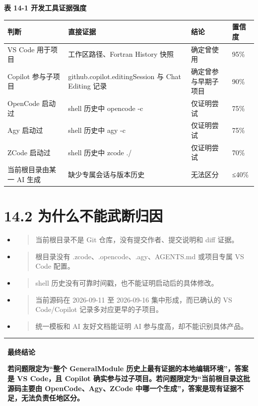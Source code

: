 \documentclass[UTF8,openany,11pt,fontset=fandol]{ctexbook}
\begin{document}
\textbf{表 14-1 开发工具证据强度}

\begin{longtable}[]{@{}llll@{}}
\toprule
\textbf{判断} & \textbf{直接证据} & \textbf{结论} &
\textbf{置信度}\tabularnewline
\midrule
\endhead
VS Code 用于项目 & 工作区路径、Fortran History 快照 & 确定曾使用 &
95\%\tabularnewline
Copilot 参与子项目 & github.copilot.editingSession 与 Chat Editing 记录
& 确定曾参与早期子项目 & 90\%\tabularnewline
OpenCode 启动过 & shell 历史中 opencode -c & 仅证明尝试 &
75\%\tabularnewline
Agy 启动过 & shell 历史中 agy -c & 仅证明尝试 & 75\%\tabularnewline
ZCode 启动过 & shell 历史中 zcode ./ & 仅证明尝试 & 70\%\tabularnewline
当前根目录由某一 AI 生成 & 缺少专属会话与版本历史 & 无法区分 &
≤40\%\tabularnewline
\bottomrule
\end{longtable}

\section{\texorpdfstring{\textbf{14.2
为什么不能武断归因}}{14.2 为什么不能武断归因}}\label{ux4e3aux4ec0ux4e48ux4e0dux80fdux6b66ux65adux5f52ux56e0}

\begin{itemize}
\item
  \begin{quote}
  当前根目录不是 Git 仓库，没有提交作者、提交说明和 diff 证据。
  \end{quote}
\item
  \begin{quote}
  根目录没有 .zcode、.opencode、.agy、AGENTS.md 或项目专属 VS Code
  配置。
  \end{quote}
\item
  \begin{quote}
  shell 历史没有可靠时间戳，也不能证明启动后的具体修改。
  \end{quote}
\item
  \begin{quote}
  当前源码在 2026-09-11 至 2026-09-16 集中形成，而已确认的 VS
  Code/Copilot 记录多对应更早的子项目。
  \end{quote}
\item
  \begin{quote}
  统一模板和 AI 友好文档能证明 AI 参与度高，却不能识别具体产品。
  \end{quote}
\end{itemize}

\begin{longtable}[]{@{}l@{}}
\toprule
\endhead
\begin{minipage}[t]{0.97\columnwidth}\raggedright
\textbf{最终结论}

若问题限定为``整个 GeneralModule 历史上最有证据的本地编辑环境''，答案是
VS Code，且 Copilot
确实参与过子项目。若问题限定为``当前根目录这批源码主要由
OpenCode、Agy、ZCode
中哪一个生成''，答案是现有证据不足，无法负责任地区分。\strut
\end{minipage}\tabularnewline
\bottomrule
\end{longtable}
\end{document}

